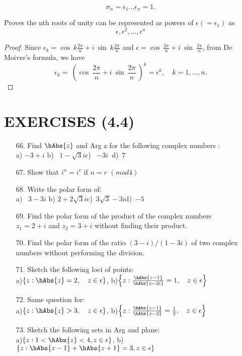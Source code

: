 \documentclass[11pt]{amsbook}
\begin{document}
$$\sigma_{n} = \epsilon_{1} \dotsc \epsilon_{n} = 1 . $$
\begin{exmp}
Proves the nth roots of unity can be represented as powers of $\epsilon\left(=\epsilon_1\right)$ as$$\epsilon,\epsilon^2,\dotsc,\epsilon^n$$
\end{exmp}
\begin{proof}
Since $\epsilon_k=\cos\ k  \frac{2\pi}{n}+i\ \sin\ k  \frac{2\pi}{n}$ and $\epsilon=\cos\ \frac{2\pi}{n}+i\ \sin\ \frac{2\pi}{n}$,
from De Moivre's formula, we have
$$\epsilon_k=\ \left(\cos\ \frac{2\pi}{n}+i\ \sin\ \frac{2\pi}{n}\ \right)^k=\epsilon^k,\quad k=1,\dotsc,n.$$
\end{proof}
\section{EXERCISES (4.4)}

\begin{enumerate}
    \item[66.] Find $\hAbs{z}$ and Arg z for the following complex numbers : \\
    a) $-3+i$ \qquad b) \ $1-\sqrt{3}i$\qquad c) \ $-3i$\qquad\ \qquad  d)\ $7$
    \item[67.]Show that $i^n=i^r$ if $n=r$ \quad $\left(mod 4\right)$
    \item[68.]Write the polar form of: \\
    a) \ $3-3i$ \qquad b) $2+2\sqrt{3}i$\qquad c)\ $3\sqrt{3}-3i$\qquad d)\ $-5$
    \item[69.]Find the polar form of the product of the complex numbers \\
    $z_1=2+i$ and $z_2=3+i$ without finding their product.
    \item[70.]Find the polar form of the ratio $\left(3-i\right)/\left(1-3i\right)$ of two complex numbers without performing the division.
    \item[71.]Sketch the following loci of points: \\
    a)$\left\{z: \hAbs{z}=2,\quad  z \in \epsilon \right\}$, \qquad
    b)$\left\{z: \frac{\hAbs{z-1}}{\hAbs{z-2i}}=1,\quad  z \in \epsilon \right\}$
    \item[72.]Same question for: \\
    a)$\left\{z: \hAbs{z}>3,\quad  z \in \epsilon \right\}$, \qquad
    b)$\left\{z: \frac{\hAbs{z-1}}{\hAbs{z-2}}=\frac{1}{2},\quad  z \in \epsilon \right\}$
    \item[73.]Sketch the following sets in Arg and plane: \\
    a)$\left\{z: 1<\hAbs{z}<4, z \in \epsilon \right\}$, \qquad 
    b)$\left\{z: \hAbs{z-1}+\hAbs{z+1}=3, z \in \epsilon \right\}$
\end{enumerate}

\end{document}
